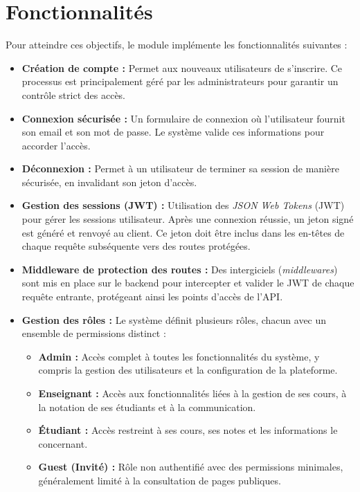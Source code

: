 \documentclass{report}
\begin{document}
\section{\color{SoftEspresso}Fonctionnalités}
Pour atteindre ces objectifs, le module implémente les fonctionnalités suivantes :
\begin{itemize}
    \item \textbf{\color{SoftEspresso}Création de compte :} Permet aux nouveaux utilisateurs de s'inscrire. Ce processus est principalement géré par les administrateurs pour garantir un contrôle strict des accès.
    \item \textbf{\color{SoftEspresso}Connexion sécurisée :} Un formulaire de connexion où l'utilisateur fournit son email et son mot de passe. Le système valide ces informations pour accorder l'accès.
    \item \textbf{\color{SoftEspresso}Déconnexion :} Permet à un utilisateur de terminer sa session de manière sécurisée, en invalidant son jeton d'accès.
    \item \textbf{\color{SoftEspresso}Gestion des sessions (JWT) :} Utilisation des \textit{JSON Web Tokens} (JWT) pour gérer les sessions utilisateur. Après une connexion réussie, un jeton signé est généré et renvoyé au client. Ce jeton doit être inclus dans les en-têtes de chaque requête subséquente vers des routes protégées.
    \item \textbf{\color{SoftEspresso}Middleware de protection des routes :} Des intergiciels (\textit{middlewares}) sont mis en place sur le backend pour intercepter et valider le JWT de chaque requête entrante, protégeant ainsi les points d'accès de l'API.
    \item \textbf{\color{SoftEspresso}Gestion des rôles :} Le système définit plusieurs rôles, chacun avec un ensemble de permissions distinct :
    \begin{itemize}
        \item \textbf{\color{GoldenGlow}Admin :} Accès complet à toutes les fonctionnalités du système, y compris la gestion des utilisateurs et la configuration de la plateforme.
        \item \textbf{\color{GoldenGlow}Enseignant :} Accès aux fonctionnalités liées à la gestion de ses cours, à la notation de ses étudiants et à la communication.
        \item \textbf{\color{GoldenGlow}Étudiant :} Accès restreint à ses cours, ses notes et les informations le concernant.
        \item \textbf{\color{GoldenGlow}Guest (Invité) :} Rôle non authentifié avec des permissions minimales, généralement limité à la consultation de pages publiques.
    \end{itemize}
\end{itemize}
\end{document}
